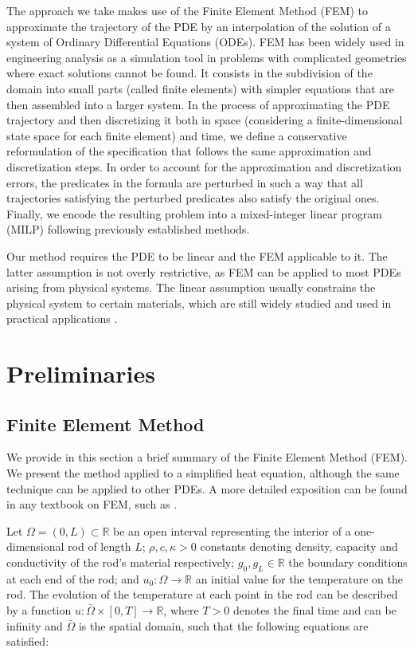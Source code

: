\documentclass[oribibl]{llncs/llncs}
\newcommand*{\R}{\mathbb{R}}
\begin{document}
The approach we take makes use of the Finite Element Method (FEM) to
approximate the trajectory of the PDE by an interpolation of the solution of a
system of Ordinary Differential Equations (ODEs). FEM has been widely used in
engineering analysis as a simulation tool in problems with complicated
geometries where exact solutions cannot be found. It consists in the subdivision
of the domain into small parts (called finite elements) with simpler equations
that are then assembled into a larger system. In the process of approximating
the PDE trajectory and then discretizing it both in space (considering a
finite-dimensional state space for each finite element) and time, we define a
conservative reformulation of the specification that follows the same approximation and
discretization steps. In order to account for the approximation and
discretization errors, the predicates in the formula are perturbed in such a way
that all trajectories satisfying the perturbed predicates also satisfy the
original ones. Finally, we encode the resulting problem into a mixed-integer
linear program (MILP) following previously established methods.

Our method requires the PDE to be linear and the FEM applicable to it. The
latter assumption is not overly restrictive, as FEM can be applied to most PDEs 
arising from physical systems. The linear assumption usually constrains the
physical system to certain materials, which are still widely studied and used in
practical applications \cite{}.

\section{Preliminaries}
\label{sec:preliminaries}

\subsection{Finite Element Method}
\label{sec:heat_equation_and_finite_element_analysis}

We provide in this section a brief summary of the Finite Element Method (FEM).
We present the method applied
to a simplified heat equation, although the same technique can be applied to other
PDEs. A more detailed exposition can be found in any
textbook on FEM, such as \cite{hughes_finite_2012-1}.

Let $\Omega = (0, L) \subset \R$ be an open interval representing the interior
of a one-dimensional rod of length $L$; $\rho, c, \kappa > 0$ 
constants denoting density, capacity and conductivity of the rod's material respectively;
$g_0, g_L \in \R$ the boundary conditions at each end of the rod; and $u_0 :
\Omega \rightarrow \R$ an initial value for the temperature on the rod. 
The evolution of the temperature at
each point in the rod can be described by a function $u : \bar \Omega \times [0,
T] \rightarrow \R$, where $T > 0$ denotes the final time and can be infinity and
$\bar \Omega$ is the spatial domain, such that the following equations are satisfied:
\end{document}
